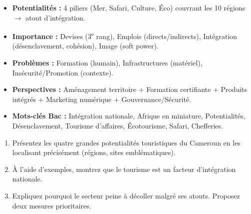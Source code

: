 \documentclass[11pt]{article}
\newcommand{\cle}[1]{{\popxbold\color{popdark}#1}}
\newcounter{popsec}
\newcounter{popsub}
\newcommand{\courssub}[1]{%
  \stepcounter{popsub}%
  \par\vspace{9pt}\noindent{\popxbold\fontsize{11.5}{13}\selectfont\color{popink}{\color{poporange}\thepopsec.\thepopsub}\hspace{6pt}#1}\par\nopagebreak\vspace{4pt}
}
\begin{document}
\courssub{Bilan de la leçon}

\begin{aretenir}
\begin{itemize}
\item \textbf{Potentialités :} 4 piliers (Mer, Safari, Culture, Éco) couvrant les 10 régions $\rightarrow$ atout d'intégration.
\item \textbf{Importance :} Devises (3\textsuperscript{e} rang), Emplois (directs/indirects), Intégration (désenclavement, cohésion), Image (soft power).
\item \textbf{Problèmes :} Formation (humain), Infrastructures (matériel), Insécurité/Promotion (contexte).
\item \textbf{Perspectives :} Aménagement territoire + Formation certifiante + Produits intégrés + Marketing numérique + Gouvernance/Sécurité.
\item \textbf{Mots-clés Bac :} \cle{Intégration nationale}, \cle{Afrique en miniature}, \cle{Potentialités}, \cle{Désenclavement}, \cle{Tourisme d'affaires}, \cle{Écotourisme}, \cle{Safari}, \cle{Chefferies}.
\end{itemize}
\end{aretenir}

\begin{exercice}
\begin{enumerate}
\item Présentez les quatre grandes potentialités touristiques du Cameroun en les localisant précisément (régions, sites emblématiques).
\item À l'aide d'exemples, montrez que le tourisme est un facteur d'intégration nationale.
\item Expliquez pourquoi le secteur peine à décoller malgré ses atouts. Proposez deux mesures prioritaires.
\end{enumerate}
\end{exercice}
\end{document}
